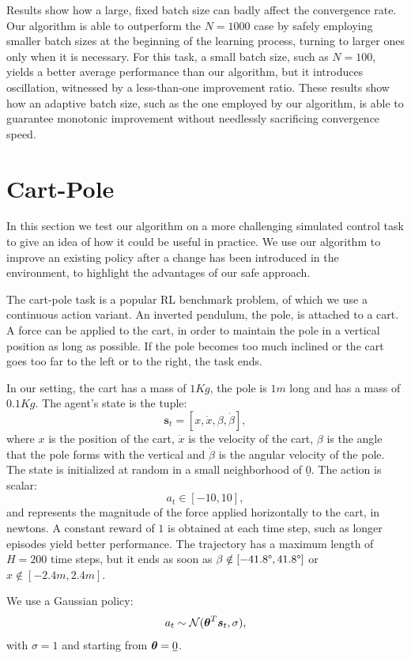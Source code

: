 Results show how a large, fixed batch size can badly affect the convergence rate. Our algorithm is able to outperform the $N=1000$ case by safely employing smaller batch sizes at the beginning of the learning process, turning to larger ones only when it is necessary.
For this task, a small batch size, such as $N=100$, yields a better average performance than our algorithm, but it introduces oscillation, witnessed by a less-than-one improvement ratio.
These results show how an adaptive batch size, such as the one employed by our algorithm, is able to guarantee monotonic improvement without needlessly sacrificing convergence speed.

\section{Cart-Pole}
In this section we test our algorithm on a more challenging simulated control task to give an idea of how it could be useful in practice. We use our algorithm to improve an existing policy after a change has been introduced in the environment, to highlight the advantages of our safe approach.

The cart-pole task is a popular \ac{RL} benchmark problem, of which we use a continuous action variant. An inverted pendulum, the pole, is attached to a cart. A force can be applied to the cart, in order to maintain the pole in a vertical position as long as possible. If the pole becomes too much inclined or the cart goes too far to the left or to the right, the task ends.

In our setting, the cart has a mass of $1Kg$, the pole is $1m$ long and has a mass of $0.1Kg$.
The agent's state is the tuple:
\[
	\boldsymbol{s}_t = [x,\dot{x},\beta,\dot{\beta}],
\]
where $x$ is the position of the cart, $\dot{x}$ is the velocity of the cart, $\beta$ is the angle that the pole forms with the vertical and $\dot{\beta}$ is the angular velocity of the pole. The state is initialized at random in a small neighborhood of $\underline{0}$.
The action is scalar:
\[
	a_t \in [-10,10],
\]
and represents the magnitude of the force applied horizontally to the cart, in newtons.
A constant reward of $1$ is obtained at each time step, such as longer episodes yield better performance. The trajectory has a maximum length of $H=200$ time steps, but it ends as soon as $\beta \notin [-41.8\degree,41.8\degree]$ or $x \notin [-2.4m, 2.4m]$.

We use a Gaussian policy:
\[
	a_t \sim \mathcal{N}(\boldsymbol{\theta}^T\boldsymbol{s}_t,\sigma),	
\]
with $\sigma=1$ and starting from $\boldsymbol{\theta}=\underline{0}$.

